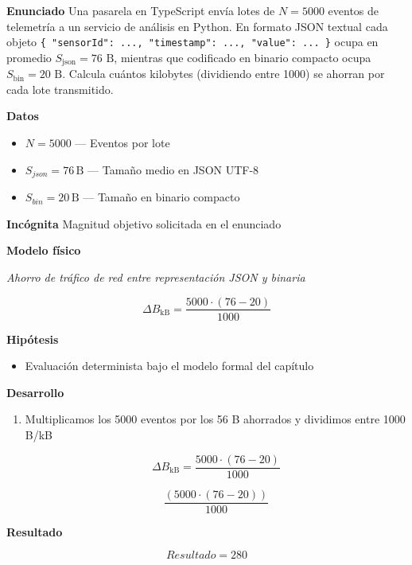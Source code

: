\documentclass{book}
\begin{document}
\begin{tcolorbox}[title={Problema resuelto}, studiumworked, breakable]

\noindent\textbf{Enunciado}
Una pasarela en TypeScript envía lotes de \(N = 5000\) eventos de telemetría a un servicio de análisis en Python. En formato JSON textual cada objeto \texttt{\{ "sensorId": ..., "timestamp": ..., "value": ... \}} ocupa en promedio \(S_{\text{json}} = 76\text{ B}\), mientras que codificado en binario compacto ocupa \(S_{\text{bin}} = 20\text{ B}\). Calcula cuántos kilobytes (dividiendo entre 1000) se ahorran por cada lote transmitido.

\noindent\textbf{Datos}
\begin{itemize}
\item $N = 5000$ — Eventos por lote
\item $S_{json} = 76\,\mathrm{B}$ — Tamaño medio en JSON UTF-8
\item $S_{bin} = 20\,\mathrm{B}$ — Tamaño en binario compacto
\end{itemize}

\noindent\textbf{Incógnita}
Magnitud objetivo solicitada en el enunciado

\noindent\textbf{Modelo físico}

\noindent\textit{Ahorro de tráfico de red entre representación JSON y binaria}

\[
\Delta B_{\text{kB}} = \frac{5000 \cdot (76 - 20)}{1000}
\]

\noindent\textbf{Hipótesis}
\begin{itemize}
\item Evaluación determinista bajo el modelo formal del capítulo
\end{itemize}

\noindent\textbf{Desarrollo}
\begin{enumerate}
\item
Multiplicamos los 5000 eventos por los 56 B ahorrados y dividimos entre 1000 B/kB

\[
\Delta B_{\text{kB}} = \frac{5000 \cdot (76 - 20)}{1000}
\]

\[
\frac{\left(5000\cdot \left(76-20\right)\right)}{1000}
\]
\end{enumerate}

\noindent\textbf{Resultado}

\[
Resultado = 280
\]


\end{tcolorbox}
\end{document}
